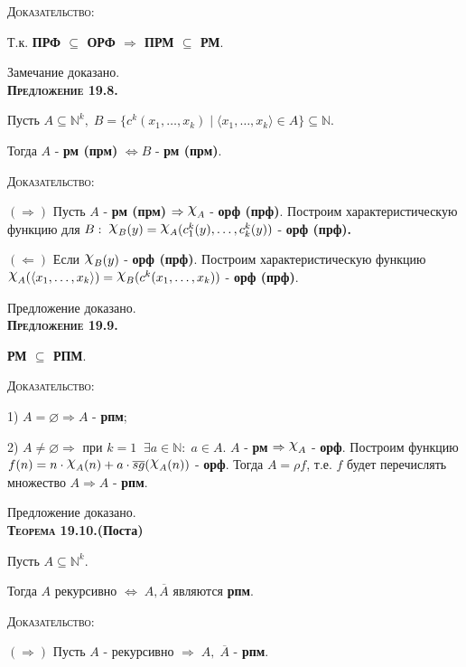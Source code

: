 \documentclass[18pt, a4paper]{extarticle}
\newcommand{\predl}[1]{\textbf{\textsc{Предложение #1}}}
\newcommand{\teor}[1]{\textbf{\textsc{Теорема #1}}}
\newcommand{\dok}{\textsc{Доказательство:}}
\begin{document}
\dok 

Т.к. \textbf{ПРФ $\subseteq$ ОРФ $\Rightarrow$ ПРМ $\subseteq$ РМ}.

Замечание доказано.\\

\predl{19.8.} 

Пусть $A\subseteq\mathbb N^k,\;B=\{c^k(x_1,\dots,x_k)\;|\;\langle x_1,\dots,x_k\rangle\in A\}\subseteq\mathbb N$. 

Тогда $A$ -  \textbf{рм (прм)} $\Leftrightarrow B$ -  \textbf{рм (прм)}.

\dok 

$\boxed{(\Rightarrow)}$ Пусть $A$ -  \textbf{рм (прм)} $\Rightarrow\raisebox{.5ex}{\scalebox{1.2}{$\chi$}}_A$ -  \textbf{орф (прф)}. Построим характеристическую функцию для $B:\;\raisebox{.5ex}{\scalebox{1.2}{$\chi$}}_B(y)=\raisebox{.5ex}{\scalebox{1.2}{$\chi$}}_A(c_1^k(y),\dots,c_k^k(y))$ -  \textbf{орф (прф).} 

$\boxed{(\Leftarrow)}$ Если $\raisebox{.5ex}{\scalebox{1.2}{$\chi$}}_B(y)$ -  \textbf{орф (прф)}. Построим характеристическую функцию $\raisebox{.5ex}{\scalebox{1.2}{$\chi$}}_A(\langle x_1,\dots,x_k\rangle)=\raisebox{.5ex}{\scalebox{1.2}{$\chi$}}_B(c^k(x_1,\dots,x_k))$ -  \textbf{орф (прф)}.

Предложение доказано.\\

\predl{19.9.} 

\textbf{РМ $\subseteq$ РПМ}.

\dok

1) $A=\varnothing\Rightarrow A$ -  \textbf{рпм};

2) $A\neq\varnothing\Rightarrow$ при $k=1\;\;\exists a\in\mathbb N:\;a\in A$. $A$ -  \textbf{рм} $\Rightarrow\raisebox{.5ex}{\scalebox{1.2}{$\chi$}}_A$ -  \textbf{орф}. Построим функцию $f(n)=n\cdot\raisebox{.5ex}{\scalebox{1.2}{$\chi$}}_A(n)+a\cdot \overline{sg}(\raisebox{.5ex}{\scalebox{1.2}{$\chi$}}_A(n))$ -  \textbf{орф}. Тогда $A=\rho f$, т.е. $f$ будет перечислять множество $A\Rightarrow A$ -  \textbf{рпм}.

Предложение доказано.\\

\teor{19.10.}\textbf{(Поста)} 

Пусть $A\subseteq\mathbb N^k$. 

Тогда $A$ рекурсивно $\Leftrightarrow\;A,\overline{A}$ являются \textbf{рпм}.

\dok

$\boxed{(\Rightarrow)}$ Пусть $A$ -  рекурсивно $\Rightarrow\;A,\;\overline{A}$ -  \textbf{рпм}.
\end{document}
